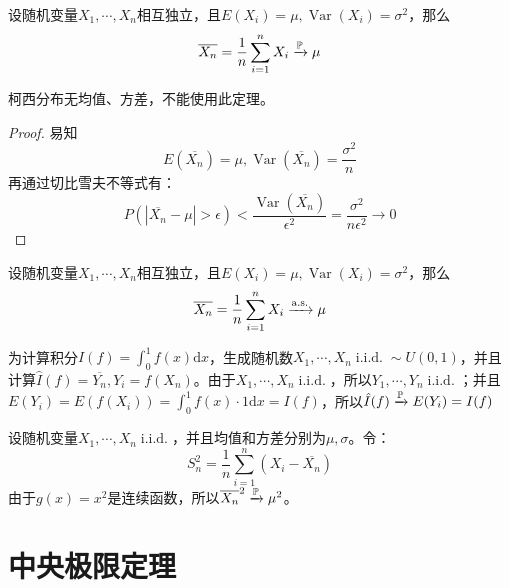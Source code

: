 \begin{theorem}[弱大数定理]
    设随机变量$X_1,\cdots ,X_n$相互独立，且$E(X_i)=\mu,\operatorname{Var}(X_i)=\sigma^2$，那么
    \[ \overline{X_n}=\frac{1}{n}\sum_{i=1}^n X_i \xrightarrow{\P} \mu \]
\end{theorem}

\begin{remark}
    柯西分布无均值、方差，不能使用此定理。
\end{remark}

\begin{proof}
    易知
    \[ E(\overline{X_n})=\mu,\operatorname{Var}(\overline{X_n})=\frac{\sigma^2}{n} \]
    再通过切比雪夫不等式有：
    \[ P(\left\vert \overline{X_n}-\mu \right\vert >\epsilon)<\frac{\operatorname{Var}(\overline{X_n})}{\epsilon^{2}}=\frac{\sigma^2}{n \epsilon^2} \to 0 \]
\end{proof}

\begin{theorem}[强大数定理]
    设随机变量$X_1,\cdots ,X_n$相互独立，且$E(X_i)=\mu,\operatorname{Var}(X_i)=\sigma^2$，那么
    \[ \overline{X_n}=\frac{1}{n}\sum_{i=1}^n X_i \xrightarrow{\as} \mu \]
\end{theorem}

\begin{example}[蒙特卡洛积分]
    为计算积分$I(f)=\int_0^1 f(x)\mathrm{d}x$，生成随机数$X_1,\cdots ,X_n \operatorname{i.i.d.} \sim U(0,1)$，并且计算$\hat{I}(f)=\overline{Y_n}, Y_i=f(X_n) $。由于$X_1,\cdots ,X_n \operatorname{i.i.d.}$，所以$Y_1,\cdots ,Y_n \operatorname{i.i.d.}$；并且$E(Y_i)=E(f(X_i))=\int_0^1 f(x)\cdot 1\mathrm{d}x=I(f)$，所以$\hat{I}(f)\xrightarrow{\P} E(Y_i)=I(f)$
\end{example}

\begin{example}[样本方差]
    设随机变量$X_1,\cdots ,X_n \operatorname{i.i.d.}$，并且均值和方差分别为$\mu,\sigma$。令：
    \[ S_n^2=\frac{1}{n}\sum_{i=1}^n(X_i-\overline{X_n}) \]
    由于$g(x)=x^2$是连续函数，所以$\overline{X_n}^2 \xrightarrow{\P} \mu^2$。
\end{example}

\section{中央极限定理}
